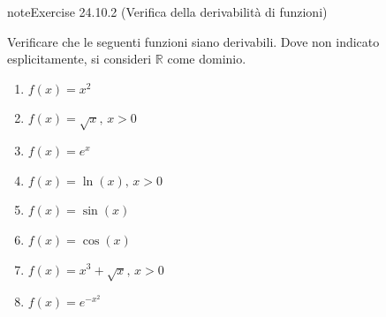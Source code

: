 \documentclass[letterpaper,10pt,italian]{jupyterBook}
\begin{document}
\begin{sphinxadmonition}{note}{Exercise 24.10.2 (Verifica della derivabilità di funzioni)}



\sphinxAtStartPar
Verificare che le seguenti funzioni siano derivabili. Dove non indicato esplicitamente, si consideri \(\mathbb{R}\) come dominio.
\begin{enumerate}
%
\item {} 
\sphinxAtStartPar
\(f(x) = x^2\)

\item {} 
\sphinxAtStartPar
\(f(x) = \sqrt{x}, \, x > 0\)

\item {} 
\sphinxAtStartPar
\(f(x) = e^x\)

\item {} 
\sphinxAtStartPar
\(f(x) = \ln(x), \, x > 0\)

\item {} 
\sphinxAtStartPar
\(f(x) = \sin(x)\)

\item {} 
\sphinxAtStartPar
\(f(x) = \cos(x)\)

\item {} 
\sphinxAtStartPar
\(f(x) = x^3 + \sqrt{x}, \, x > 0\)

\item {} 
\sphinxAtStartPar
\(f(x) = e^{-x^2}\)

\end{enumerate}

\sphinxAtStartPar
{}
\end{sphinxadmonition}
 \label{exercise:ch/infinitesimal_calculus/derivatives-problems-exercise-2}
\end{document}
